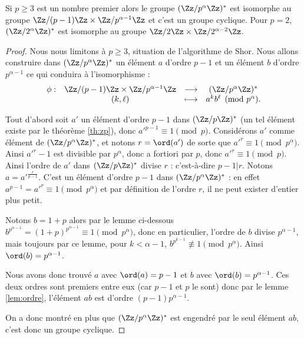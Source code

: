 \documentclass[11pt,class=report,crop=false]{standalone}
\begin{document}
\begin{theoreme}
\label{th:zpalpha}
Si $p\ge3$ est un nombre premier alors le groupe $(\Zz/p^\alpha\Zz)^*$ est isomorphe au groupe $\Zz/(p-1)\Zz \times \Zz/p^{\alpha-1}\Zz$ et c'est un groupe cyclique.
Pour $p=2$, $(\Zz/2^\alpha\Zz)^*$ est isomorphe au groupe $\Zz/2\Zz \times \Zz/2^{\alpha-2}\Zz$.
\end{theoreme}


\begin{proof}
Nous nous limitons à $p\ge3$, situation de l'algorithme de Shor.
Nous allons construire dans $(\Zz/p^\alpha\Zz)^*$ un élément $a$ d'ordre $p-1$ et un élément $b$ d'ordre $p^{\alpha-1}$ ce qui conduira à l'isomorphisme :
$$
\begin{array}{cccc}
\phi : & \Zz/(p-1)\Zz\times \Zz/p^{\alpha-1}\Zz & \longrightarrow & (\Zz/p^\alpha\Zz)^* \\
       & (k,\ell)            &\longmapsto      & a^k b^\ell \pmod {p^\alpha}.
\end{array}
$$


Tout d'abord soit $a'$ un élément d'ordre $p-1$ dans $(\Zz/p\Zz)^*$ (un tel élément existe par le théorème \ref{th:zp}), donc $a'^{p-1} \equiv 1 \pmod{p}$.
Considérons $a'$ comme élément de $(\Zz/p^\alpha\Zz)^*$, et notons $r=\ord(a')$ de sorte que $a'^{r} \equiv 1 \pmod{p^\alpha}$. Ainsi $a'^{r}-1$ est divisible par $p^\alpha$, donc a fortiori par $p$, donc $a'^{r} \equiv 1 \pmod{p}$. Ainsi l'ordre de $a'$ dans $(\Zz/p\Zz)^*$ divise $r$ : c'est-à-dire $p-1 | r$. Notons
$a = a'^{\frac{r}{p-1}}$. C'est un élément d'ordre $p-1$ dans $(\Zz/p^\alpha\Zz)^*$ : en effet $a^{p-1} = a'^r \equiv 1 \pmod {p^\alpha}$ et par définition de l'ordre $r$, il ne peut exister d'entier plus petit.

Notons $b=1+p$ alors par le lemme ci-dessous 
$b^{p^{\alpha-1}} = (1+p)^{p^{\alpha-1}} \equiv 1 \pmod{p^{\alpha}}$,
donc en particulier, l'ordre de $b$ divise $p^{\alpha-1}$, mais toujours par ce lemme, pour $k < \alpha-1$, $b^{p^{k-1}} \not\equiv 1 \pmod{p^{\alpha}}$. Ainsi $\ord(b) = p^{\alpha-1}$. 

Nous avons donc trouvé $a$ avec $\ord(a)=p-1$ et $b$ avec $\ord(b) = p^{\alpha-1}$. Ces deux ordres sont premiers entre eux (car $p-1$ et $p$ le sont) donc par le lemme \ref{lem:ordre}, l'élément $ab$ est d'ordre $(p-1)p^{\alpha-1}$.

On a donc montré en plus que $(\Zz/p^\alpha\Zz)^*$ est engendré par le seul élément $ab$, c'est donc un groupe cyclique.
\end{proof}
\end{document}

